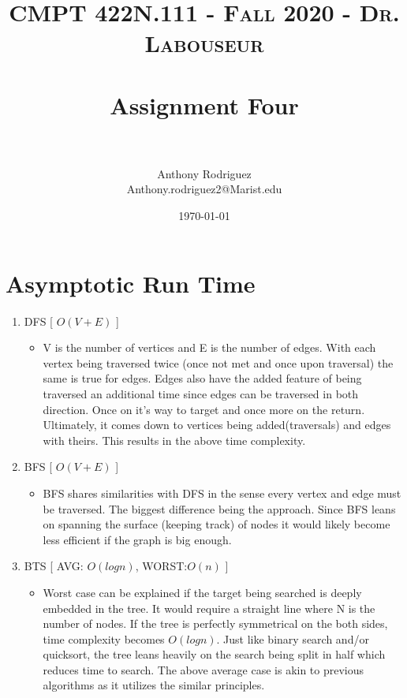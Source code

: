 \documentclass[letterpaper, 10pt,DIV=13]{scrartcl}
\title{	
   \normalfont \normalsize 
   \textsc{CMPT 422N.111 - Fall 2020 - Dr. Labouseur} \\[10pt] %
   \horrule{0.5pt} \\[0.25cm] 	%
   \huge Assignment Four  \\     	    %
   \horrule{0.5pt} \\[0.25cm] 	%
}
\author{Anthony Rodriguez \\ \normalsize Anthony.rodriguez2@Marist.edu}
\date{\normalsize\today} 	%
\numberwithin{equation}{section} %
\numberwithin{figure}{section} %
\numberwithin{table}{section} %
\begin{document}
\maketitle %

\section{Asymptotic Run Time}
\bigskip

\begin{enumerate}
   \item DFS [ $O(V + E)$ ]
   \begin{itemize}
     \item V is the number of vertices and E is the number of edges. With each vertex being traversed twice (once not met and once upon traversal) the same is true for edges. Edges also have the added feature of being traversed an additional time since edges can be traversed in both direction. Once on it's way to target and once more on the return. Ultimately, it comes down to vertices being added(traversals) and edges with theirs. This results in the above time complexity.
   \end{itemize}
   \bigskip
   \item BFS [ $O(V + E)$ ]
   \begin{itemize}
       \item BFS shares similarities with DFS in the sense every vertex and edge must be traversed. The biggest difference being the approach. Since BFS leans on spanning the surface (keeping track) of nodes it would likely become less efficient if the graph is big enough.  
   \end{itemize}
   \bigskip
    
   \item BTS [ AVG: $O(logn)$, WORST:$O(n)$  ]
    \begin{itemize}
        \item Worst case can be explained if the target being searched is deeply embedded in the tree. It would require a straight line where N is the number of nodes. If the tree is perfectly symmetrical on the both sides, time complexity becomes $O(logn)$. Just like binary search and/or quicksort, the tree leans heavily on the search being split in half which reduces time to search. The above average case is akin to previous algorithms as it utilizes the similar principles.    
    \end{itemize}
    \bigskip
      
    
\end{enumerate}
\end{document}
